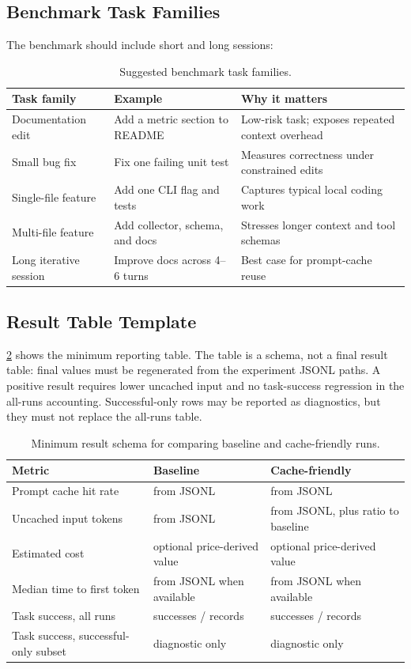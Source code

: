 \subsection{Benchmark Task Families}

The benchmark should include short and long sessions:
\begin{table}[h]
\centering
\caption{Suggested benchmark task families.}
\label{tab:tasks}
\small
\begin{tabularx}{\linewidth}{@{}lXX@{}}
\toprule
\textbf{Task family} & \textbf{Example} & \textbf{Why it matters} \\
\midrule
Documentation edit & Add a metric section to README & Low-risk task; exposes repeated context overhead \\
Small bug fix & Fix one failing unit test & Measures correctness under constrained edits \\
Single-file feature & Add one CLI flag and tests & Captures typical local coding work \\
Multi-file feature & Add collector, schema, and docs & Stresses longer context and tool schemas \\
Long iterative session & Improve docs across 4--6 turns & Best case for prompt-cache reuse \\
\bottomrule
\end{tabularx}
\end{table}

\subsection{Result Table Template}

\cref{tab:results-template} shows the minimum reporting table. The table is a schema, not a final result table: final values must be regenerated from the experiment JSONL paths. A positive result requires lower uncached input and no task-success regression in the all-runs accounting. Successful-only rows may be reported as diagnostics, but they must not replace the all-runs table.

\begin{table}[h]
\centering
\caption{Minimum result schema for comparing baseline and cache-friendly runs.}
\label{tab:results-template}
\small
\begin{tabularx}{\linewidth}{@{}lXX@{}}
\toprule
\textbf{Metric} & \textbf{Baseline} & \textbf{Cache-friendly} \\
\midrule
Prompt cache hit rate & from JSONL & from JSONL \\
Uncached input tokens & from JSONL & from JSONL, plus ratio to baseline \\
Estimated cost & optional price-derived value & optional price-derived value \\
Median time to first token & from JSONL when available & from JSONL when available \\
Task success, all runs & successes / records & successes / records \\
Task success, successful-only subset & diagnostic only & diagnostic only \\
\bottomrule
\end{tabularx}
\end{table}

